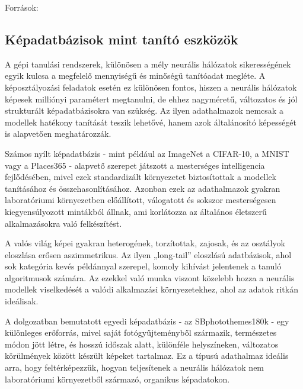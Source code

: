             \begin{flushright}
                \small
                Források: \cite{article_cnn_survey} \cite{article_cnn_metrics} \cite{article_cnn_image_class}
            \end{flushright}
            
        \subsection{Képadatbázisok mint tanító eszközök}
            A gépi tanulási rendszerek, különösen a mély neurális hálózatok sikerességének egyik kulcsa a megfelelő mennyiségű és minőségű tanítóadat megléte. A képosztályozási feladatok esetén ez különösen fontos, hiszen a neurális hálózatok képesek milliónyi paramétert megtanulni, de ehhez nagyméretű, változatos és jól strukturált képadatbázisokra van szükség. Az ilyen adathalmazok nemcsak a modellek hatékony tanítását teszik lehetővé, hanem azok általánosító képességét is alapvetően meghatározzák.

            Számos nyílt képadatbázis - mint például az ImageNet \cite{article_ImageNet1K} a CIFAR-10, a MNIST vagy a Places365 \cite{article_places365} - alapvető szerepet játszott a mesterséges intelligencia fejlődésében, mivel ezek standardizált környezetet biztosítottak a modellek tanításához és összehasonlításához. Azonban ezek az adathalmazok gyakran laboratóriumi környezetben előállított, válogatott és sokszor mesterségesen kiegyensúlyozott mintákból állnak, ami korlátozza az általános életszerű alkalmazásokra való felkészítést.
            
            A valós világ képei gyakran heterogének, torzítottak, zajosak, és az osztályok eloszlása erősen aszimmetrikus. Az ilyen „long-tail” eloszlású adatbázisok, ahol sok kategória kevés példánnyal szerepel, komoly kihívást jelentenek a tanuló algoritmusok számára. Az ezekkel való munka viszont közelebb hozza a neurális modellek viselkedését a valódi alkalmazási környezetekhez, ahol az adatok ritkán ideálisak.
            
            A dolgozatban bemutatott egyedi képadatbázis - az SBphotothemes180k - egy különleges erőforrás, mivel saját fotógyűjteményből származik, természetes módon jött létre, és hosszú időszak alatt, különféle helyszíneken, változatos körülmények között készült képeket tartalmaz. Ez a típusú adathalmaz ideális arra, hogy feltérképezzük, hogyan teljesítenek a neurális hálózatok nem laboratóriumi környezetből származó, organikus képadatokon.
            

